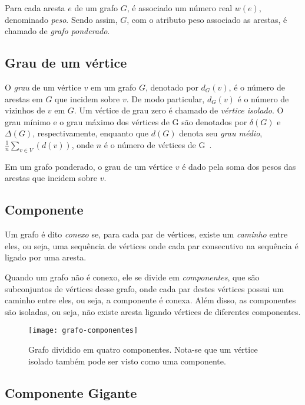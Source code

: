 Para cada aresta $e$ de um grafo $G$, é associado um número real $w(e)$, denominado \emph{peso}. Sendo assim, $G$, com o atributo peso associado as arestas, é chamado de \emph{grafo ponderado}.

\subsection{Grau de um vértice}
\label{conceitos__grafo--grau}

\def \variable {\emph{v}}

O \emph{grau} de um vértice $v$ em um grafo $G$, denotado por $d_{G}(v)$, é o número de arestas em $G$ que incidem sobre $v$. De modo particular, $d_{G}(v)$ é o número de vizinhos de $v$ em $G$. Um vértice de grau zero é chamado de \emph{vértice isolado}. O grau mínimo e o grau máximo dos vértices de G são denotados por $\delta(G)$ e $\Delta(G)$, respectivamente, enquanto que $d(G)$ denota seu \emph{grau médio}, $\frac{1}{n}\sum_{v\in V}(d(v))$, onde $n$ é o número de vértices de G~\cite{bondy1976graph}.

Em um grafo ponderado, o grau de um vértice $v$ é dado pela soma dos pesos das arestas que incidem sobre $v$.

\subsection{Componente}
\label{conceitos__grafo--componente}

Um grafo é dito \emph{conexo} se, para cada par de vértices, existe um \emph{caminho} entre eles, ou seja, uma sequência de vértices onde cada par consecutivo na sequência é ligado por uma aresta.

Quando um grafo não é conexo, ele se divide em \emph{componentes}, que são subconjuntos de vértices desse grafo, onde cada par destes vértices possui um caminho entre eles, ou seja, a componente é conexa. Além disso, as componentes são isoladas, ou seja, não existe aresta ligando vértices de diferentes componentes.

\begin{figure}[H]
    \texttt{[image: grafo-componentes]}
    \centering
    \caption{Grafo dividido em quatro componentes. Nota-se que um vértice isolado também pode ser visto como uma componente.}
\end{figure}

\subsection{Componente Gigante}
\label{conceitos__grafo--componente-gigante}


